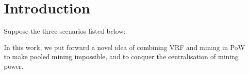 \section{Introduction}





Suppose the three scenarios listed below:







In this work, we put forward a novel idea of combining VRF and mining in PoW to make pooled mining impossible, and to conquer the centralisation of mining power.